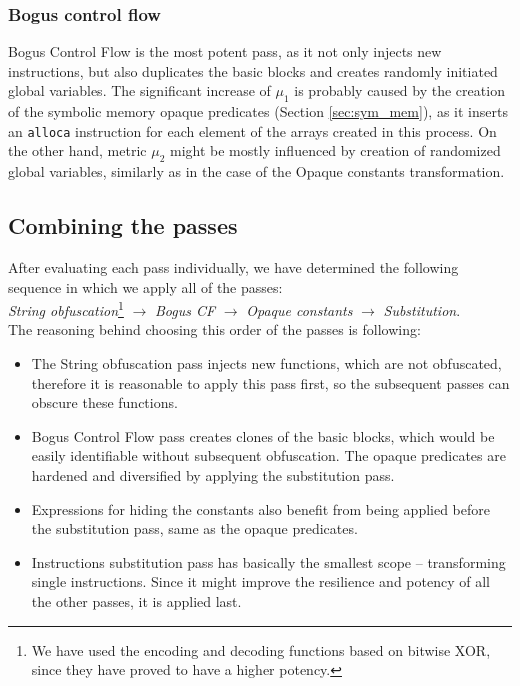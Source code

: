 \documentclass[
  digital, %
  notable,   %
  twoside, %
  nolof,     %
  nolot,     %
]{fithesis3}
\theoremstyle{definition}
\begin{document}
\subsubsection{Bogus control flow}
Bogus Control Flow is the most potent pass, as it not only injects new instructions, but also duplicates the basic blocks and creates randomly initiated global variables. The significant increase of $\mu_1$ is probably caused by the creation of the symbolic memory opaque predicates (Section \ref{sec:sym_mem}), as it inserts an \texttt{alloca} instruction for each element of the arrays created in this process. On the other hand, metric $\mu_2$ might be mostly influenced by creation of randomized global variables, similarly as in the case of the Opaque constants transformation. 

\subsection{Combining the passes} \label{sec:combine}

After evaluating each pass individually, we have determined the following sequence in which we apply all of the passes: \\

\textit{String obfuscation}\footnote{We have used the encoding and decoding functions based on bitwise XOR, since they have proved to have a higher potency.} $\rightarrow$ \textit{Bogus CF} $\rightarrow$ \textit{Opaque constants} $\rightarrow$ \textit{Substitution}. \\

The reasoning behind choosing this order of the passes is following: 

\begin{itemize}
    \item The String obfuscation pass injects new functions, which are not obfuscated, therefore it is reasonable to apply this pass first, so the subsequent passes can obscure these functions.
    \item Bogus Control Flow pass creates clones of the basic blocks, which would be easily identifiable without subsequent obfuscation. The opaque predicates are hardened and diversified by applying the substitution pass. 
    \item Expressions for hiding the constants also benefit from being applied before the substitution pass, same as the opaque predicates.
    \item Instructions substitution pass has basically the smallest scope -- transforming single instructions. Since it might improve the resilience and potency of all the other passes, it is applied last.
\end{itemize}
\end{document}
